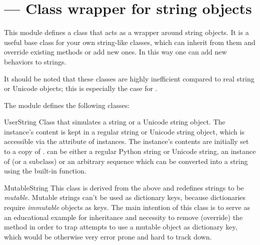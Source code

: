 

\section{ ---
         Class wrapper for string objects}



This module defines a class that acts as a wrapper around string
objects.  It is a useful base class for your own string-like classes,
which can inherit from them and override existing methods or add new
ones.  In this way one can add new behaviors to strings.

It should be noted that these classes are highly inefficient compared
to real string or Unicode objects; this is especially the case for
.

The  module defines the following classes:

\begin{classdesc}{UserString}{}
Class that simulates a string or a Unicode string
object.  The instance's content is kept in a regular string or Unicode
string object, which is accessible via the  attribute of
 instances.  The instance's contents are initially
set to a copy of .   can be either a
regular Python string or Unicode string, an instance of
 (or a subclass) or an arbitrary sequence which can
be converted into a string using the built-in  function.
\end{classdesc}

\begin{classdesc}{MutableString}{}
This class is derived from the  above and redefines
strings to be \emph{mutable}.  Mutable strings can't be used as
dictionary keys, because dictionaries require \emph{immutable} objects as
keys.  The main intention of this class is to serve as an educational
example for inheritance and necessity to remove (override) the
 method in order to trap attempts to use a
mutable object as dictionary key, which would be otherwise very
error prone and hard to track down.
\end{classdesc}

